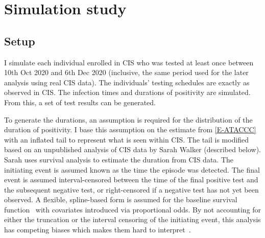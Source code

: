 \documentclass[thesis.tex]{subfiles}
\begin{document}
\section{Simulation study} \label{perf-test:sec:simulation-study}

\subsection{Setup}

I simulate each individual enrolled in CIS who was tested at least once between 10th Oct 2020 and 6th Dec 2020 (inclusive, the same period used for the later analysis using real CIS data).
The individuals' testing schedules are exactly as observed in CIS.
The infection times and durations of positivity are simulated.
From this, a set of test results can be generated.

To generate the durations, an assumption is required for the distribution of the duration of positivity.
I base this assumption on the estimate from \cref{E-ATACCC} with an inflated tail to represent what is seen within CIS.
The tail is modified based on an unpublished analysis of CIS data by Sarah Walker (described below).
Sarah uses survival analysis to estimate the duration from CIS data.
The initiating event is assumed known as the time the episode was detected.
The final event is assumed interval-censored between the time of the final positive test and the subsequent negative test, or right-censored if a negative test has not yet been observed.
A flexible, spline-based form is assumed for the baseline survival function~\autocite{roystonSTPM,roystonFlexible} with covariates introduced via proportional odds.
By not accounting for either the truncation or the interval censoring of the initiating event, this analysis has competing biases which makes them hard to interpret~\autocite{cisMethodsONS}.

\end{document}

